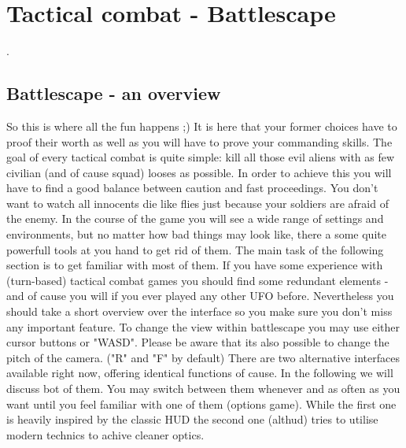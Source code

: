 
%
%


\chapter{Tactical combat - Battlescape}

.

\section{Battlescape - an overview}
So this is where all the fun happens ;) It is here that your former choices have to proof their worth as well as you will have to prove your commanding skills.
The goal of every tactical combat is quite simple: kill all those evil aliens with as few civilian (and of cause squad) looses as possible. In order to achieve this you will have to find a good balance between caution and fast proceedings. You don't want to watch all innocents die like flies just because your soldiers are afraid of the enemy.
In the course of the game you will see a wide range of settings and environments, but no matter how bad things may look like, there a some quite powerfull tools at you hand to get rid of them. The main task of the following section is to get familiar with most of them. If you have some experience with (turn-based) tactical combat games you should find some redundant elements - and of cause you will if you ever played any other UFO before. Nevertheless you should take a short overview over the interface so you make sure you don't miss any important feature. To change the view within battlescape you may use either cursor buttons or "WASD". Please be aware that its also possible to change the pitch of the camera. ("R" and "F" by default)
There are two alternative interfaces available right now, offering identical functions of cause. In the following we will discuss bot of them. You may switch between them whenever and as often as you want until you feel familiar with one of them (options \hookrightarrow game).
While the first one is heavily inspired by the classic HUD the second one (althud) tries to utilise modern technics to achive cleaner optics.

